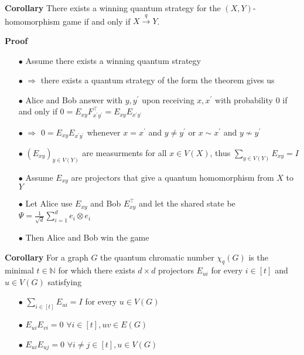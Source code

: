 \documentclass[13.5pt]{beamer}
\begin{document}
\begin{frame}
\begin{block}{\color{colorblue}\textbf{Corollary}}
There exists a winning quantum strategy for the $(X,Y)$-homomorphism game if and only if $X \overset{q}{\rightarrow}Y$. \pause
\end{block}
\begin{block}{\color{colororange}\textbf{Proof}} \pause
\begin{itemize} 
\item[$\bullet$] Assume there exists a winning quantum strategy \pause
\item[$\bullet$] $\Rightarrow$ there exists a quantum strategy of the form the theorem gives us \pause
\item[$\bullet$] Alice and Bob answer with $y, y^\prime$ upon receiving $x, x^\prime$ with probability $0$ if and only if $0=E_{xy}F_{x^\prime y^\prime}^\top = E_{xy}E_{x^\prime y^\prime}$ \pause
\item[$\bullet$] $\Rightarrow$ $0=E_{xy}E_{x^\prime y^\prime}$ whenever $x=x^\prime$ and $y \ne y^\prime$ or $x \sim x^\prime $ and $y \nsim y^\prime$ \pause
\item[$\bullet$] $(E_{xy})_{y \in V(Y)}$ are measurments for all $x \in V(X)$, thus  $\sum_{y \in V(Y)} E_{xy} = I$ 

\end{itemize}
\end{block}
\end{frame}

\begin{frame}
\begin{itemize} 
\item[$\bullet$] Assume $E_{xy}$ are projectors that give a quantum homomorphism from $X$ to $Y$ \pause
\item[$\bullet$] Let Alice use $E_{xy}$ and Bob $E_{xy}^\top$ and let the shared state be 
$\Psi = \frac{1}{\sqrt{d}} \sum_{i=1}^d e_i \otimes e_i$ \pause 
\item[$\bullet$] Then Alice and Bob win the game 


\end{itemize}
\end{frame}

\begin{frame}
\begin{block}{\color{colorblue}\textbf{Corollary}}
For a graph $G$ the quantum chromatic number $\chi_q(G)$ is the minimal $t\in \mathbb{N}$ for which there exists $d \times d$ projectors $E_{ui}$ for every $i \in [t]$ and $u\in V(G)$ satisfying \pause

\begin{itemize}
\item[$\bullet$] $\sum_{i \in [t]} E_{ui} = I$ for every $u \in V(G)$ \pause
\item[$\bullet$] $E_{ui}E_{vi} = 0$ $\forall i \in [t], uv \in E(G)$ \pause
\item[$\bullet$] $E_{ui}E_{uj} = 0$ $\forall i \ne j \in [t], u \in V(G)$
\end{itemize}

\end{block}

\end{frame}
\end{document}
